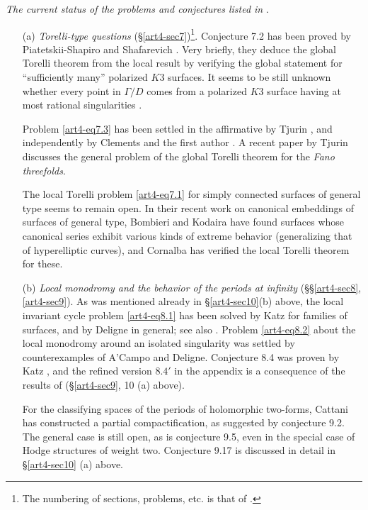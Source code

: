 \textit{The current status of the problems and conjectures listed in} \cite{art4-key21}.

\begin{itemize}
\item[(a)] \textit{Torelli-type questions} (\S \ref{art4-sec7})\footnote[45]{The numbering of sections, problems, etc. is that of \cite{art4-key21}.}. Conjecture 7.2 has been proved by Piatetskii-Shapiro and Shafarevich \cite{art4-key40}. Very briefly, they deduce the global Torelli theorem from the local result by verifying the global statement for ``sufficiently many'' polarized $K3$ surfaces. It seems to be still unknown whether every point in $\Gamma/ D$ comes from a polarized $K3$ surface having at most rational singularities \cite{art4-key37}.

Problem \eqref{art4-eq7.3} has been settled in the affirmative by Tjurin \cite{art4-key43}, and independently by Clements and the first author \cite{art4-key9}. A recent paper by Tjurin \cite{art4-key42} discusses the general problem of the global Torelli theorem for the \textit{Fano threefolds}.

The local Torelli problem \eqref{art4-eq7.1} for simply connected surfaces of general type seems to remain open. In their recent work on canonical embeddings of surfaces of general type, Bombieri and Kodaira \cite{art4-key3} have found surfaces whose canonical series exhibit various kinds of extreme behavior (generalizing that of hyperelliptic curves), and Cornalba has verified the local Torelli theorem for these.

\item[(b)] \textit{Local monodromy and the behavior of the periods at infinity} (\S \S \ref{art4-sec8}, \ref{art4-sec9}). As was mentioned already in \S \ref{art4-sec10}(b) above, the local invariant cycle problem \eqref{art4-eq8.1} has been solved by Katz for families of surfaces, and by Deligne in general; see also \cite{art4-key10}. Problem \eqref{art4-eq8.2} about the local monodromy around an isolated singularity was settled by counterexamples of A'Campo and Deligne. Conjecture 8.4 was proven by Katz \cite{art4-key31}, and the refined version $8.4'$ in the appendix is a consequence of the results of \cite{art4-key41}
(\cf \S\ref{art4-sec9}, 10 (a) above).

For the classifying spaces of the periods of holomorphic two-forms, Cattani \cite{art4-key6} has constructed a partial compactification, as suggested by conjecture 9.2. The general case is still open, as is conjecture 9.5, even in the special case of Hodge structures of weight two. Conjecture 9.17 is discussed in detail in \S \ref{art4-sec10} (a) above.


\end{itemize}
